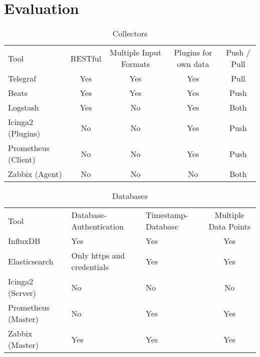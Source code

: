\chapter{Evaluation} %
\begin{table}[]
\centering
\caption{Collectors}
\label{my-label}
\begin{tabular}{p{3cm}cccc}
Tool & RESTful                     & Multiple Input Formats      & Plugins for own data        & Push / Pull                  \\
Telegraf                     & Yes & Yes                         & Yes                         & Pull                         \\
Beats                        & Yes                         & Yes & Yes                         & Push                         \\
Logstash                     & Yes                         & No                          & Yes & Both                         \\
Icinga2 (Plugins)            & No                          & No                          & Yes                         & Push \\
Prometheus (Client)          & No                          & No                          & Yes                         & Push \\
Zabbix (Agent)               & No                          & No                          & No  & Both                        
\end{tabular}
\end{table}

\begin{table}[]
\centering
\caption{Databases}
\label{my-label}
\begin{tabular}{p{3cm}p{3cm}p{3cm}c}
Tool & Database-Authentication     & Timestamp-Database          & Multiple Data Points        \\
InfluxDB                     & Yes & Yes                         & Yes                         \\
Elasticsearch                & Only https and credentials  & Yes & Yes                         \\
Icinga2 (Server)             & No                          & No                          & No                          \\
Prometheus (Master)          & No                          & Yes & Yes                         \\
Zabbix (Master)              & Yes                         & Yes                         & Yes
\end{tabular}
\end{table}

